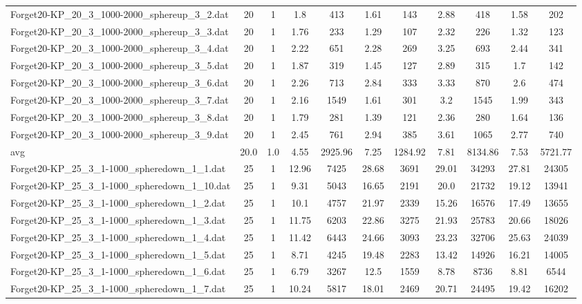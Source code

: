 \begin{table}[!ht]
\begin{tabular}{lcccccccccc}
Forget20-KP\_20\_3\_1000-2000\_sphereup\_3\_2.dat & 20 & 1 & 1.8 & 413 & 1.61 & 143 & 2.88 & 418 & 1.58 & 202 \\
Forget20-KP\_20\_3\_1000-2000\_sphereup\_3\_3.dat & 20 & 1 & 1.76 & 233 & 1.29 & 107 & 2.32 & 226 & 1.32 & 123 \\
Forget20-KP\_20\_3\_1000-2000\_sphereup\_3\_4.dat & 20 & 1 & 2.22 & 651 & 2.28 & 269 & 3.25 & 693 & 2.44 & 341 \\
Forget20-KP\_20\_3\_1000-2000\_sphereup\_3\_5.dat & 20 & 1 & 1.87 & 319 & 1.45 & 127 & 2.89 & 315 & 1.7 & 142 \\
Forget20-KP\_20\_3\_1000-2000\_sphereup\_3\_6.dat & 20 & 1 & 2.26 & 713 & 2.84 & 333 & 3.33 & 870 & 2.6 & 474 \\
Forget20-KP\_20\_3\_1000-2000\_sphereup\_3\_7.dat & 20 & 1 & 2.16 & 1549 & 1.61 & 301 & 3.2 & 1545 & 1.99 & 343 \\
Forget20-KP\_20\_3\_1000-2000\_sphereup\_3\_8.dat & 20 & 1 & 1.79 & 281 & 1.39 & 121 & 2.36 & 280 & 1.64 & 136 \\
Forget20-KP\_20\_3\_1000-2000\_sphereup\_3\_9.dat & 20 & 1 & 2.45 & 761 & 2.94 & 385 & 3.61 & 1065 & 2.77 & 740 \\
\hline avg & 20.0 & 1.0 & 4.55& 2925.96 & 7.25& 1284.92 & 7.81& 8134.86 & 7.53& 5721.77\\ \hline
Forget20-KP\_25\_3\_1-1000\_spheredown\_1\_1.dat & 25 & 1 & 12.96 & 7425 & 28.68 & 3691 & 29.01 & 34293 & 27.81 & 24305 \\
Forget20-KP\_25\_3\_1-1000\_spheredown\_1\_10.dat & 25 & 1 & 9.31 & 5043 & 16.65 & 2191 & 20.0 & 21732 & 19.12 & 13941 \\
Forget20-KP\_25\_3\_1-1000\_spheredown\_1\_2.dat & 25 & 1 & 10.1 & 4757 & 21.97 & 2339 & 15.26 & 16576 & 17.49 & 13655 \\
Forget20-KP\_25\_3\_1-1000\_spheredown\_1\_3.dat & 25 & 1 & 11.75 & 6203 & 22.86 & 3275 & 21.93 & 25783 & 20.66 & 18026 \\
Forget20-KP\_25\_3\_1-1000\_spheredown\_1\_4.dat & 25 & 1 & 11.42 & 6443 & 24.66 & 3093 & 23.23 & 32706 & 25.63 & 24039 \\
Forget20-KP\_25\_3\_1-1000\_spheredown\_1\_5.dat & 25 & 1 & 8.71 & 4245 & 19.48 & 2283 & 13.42 & 14926 & 16.21 & 14005 \\
Forget20-KP\_25\_3\_1-1000\_spheredown\_1\_6.dat & 25 & 1 & 6.79 & 3267 & 12.5 & 1559 & 8.78 & 8736 & 8.81 & 6544 \\
Forget20-KP\_25\_3\_1-1000\_spheredown\_1\_7.dat & 25 & 1 & 10.24 & 5817 & 18.01 & 2469 & 20.71 & 24495 & 19.42 & 16202 \\

\end{tabular}
\end{table}
